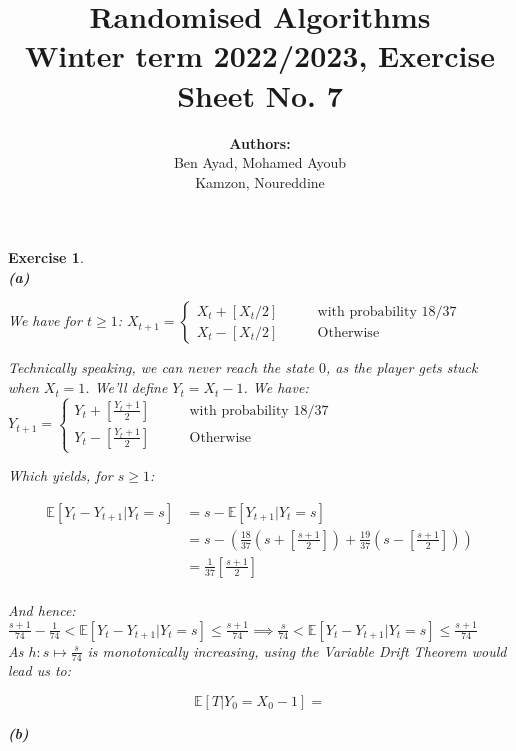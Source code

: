 \documentclass{article}
\title{Randomised Algorithms \\
Winter term 2022/2023, Exercise Sheet No. 7}
\author{
    \textbf{Authors:} \\
    Ben Ayad, Mohamed Ayoub \\
    Kamzon, Noureddine
}
\newtheorem{exo}{Exercise}
\def\E{\mathbb{E}}
\begin{document}
\maketitle

\begin{exo}{\ \\}
\noindent
\textbf{(a)} 

We have for $t \geq 1$:  \quad \quad  $
X_{t+1}  = 
\begin{cases}
    X_t + [X_t/2]  \quad \quad &\text{with probability 18/37} \\
    X_t - [X_t/2]  &\text{Otherwise}
\end{cases}
$

Technically speaking, we can never reach the state $0$, as the player gets stuck when $X_t = 1$. We'll define $Y_t = X_t - 1$. We have: $
Y_{t+1}  = 
\begin{cases}
    Y_t + [\frac{Y_t+1}{2}]  \quad \quad &\text{with probability 18/37} \\
    Y_t - [\frac{Y_t+1}{2}]  &\text{Otherwise}
\end{cases}
$

Which yields, for $s \geq 1$:

\begin{align*}
    \E[Y_t-Y_{t+1}| Y_t = s] 
    &= s - \E[Y_{t+1}|Y_t = s] \\
    &= s - (\frac{18}{37}(s+[\frac{s+1}{2}])  
    + \frac{19}{37}(s-[\frac{s+1}{2}])) \\
    &= \frac{1}{37} [\frac{s+1}{2}] \\
\end{align*}

And hence: $\frac{s+1}{74} - \frac{1}{74}  < \E[Y_t - Y_{t+1}| Y_t = s] \leq \frac{s+1}{74}  \implies \frac{s}{74} < \E[Y_t - Y_{t+1}| Y_t = s] \leq \frac{s+1}{74} $ \\

As $h: s \mapsto \frac{s}{74}$ is monotonically increasing, using the Variable Drift Theorem would lead us to:

\[ \E[T | Y_0 = X_0 - 1 ] =    \]

\noindent
\textbf{(b)} 


\end{exo}
\end{document}
